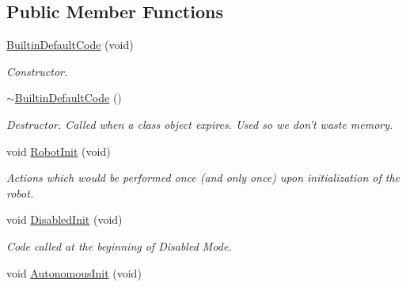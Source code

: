\subsection*{Public Member Functions}
\begin{DoxyCompactItemize}
\item 
\hyperlink{class_builtin_default_code_abcae5a572e0a119a69625edf19612203}{BuiltinDefaultCode} (void)
\begin{DoxyCompactList}\small\item\em Constructor. \item\end{DoxyCompactList}\item 
\hypertarget{class_builtin_default_code_aca7d57e622ea4ab27fb5270037cc0a22}{
\hyperlink{class_builtin_default_code_aca7d57e622ea4ab27fb5270037cc0a22}{$\sim$BuiltinDefaultCode} ()}
\label{class_builtin_default_code_aca7d57e622ea4ab27fb5270037cc0a22}

\begin{DoxyCompactList}\small\item\em Destructor. Called when a class object expires. Used so we don't waste memory. \item\end{DoxyCompactList}\item 
\hypertarget{class_builtin_default_code_adbc329f518be839e728ddc5e4d35bed1}{
void \hyperlink{class_builtin_default_code_adbc329f518be839e728ddc5e4d35bed1}{RobotInit} (void)}
\label{class_builtin_default_code_adbc329f518be839e728ddc5e4d35bed1}

\begin{DoxyCompactList}\small\item\em Actions which would be performed once (and only once) upon initialization of the robot. \item\end{DoxyCompactList}\item 
\hypertarget{class_builtin_default_code_abe31b16407ded0236a67b29fbab7e321}{
void \hyperlink{class_builtin_default_code_abe31b16407ded0236a67b29fbab7e321}{DisabledInit} (void)}
\label{class_builtin_default_code_abe31b16407ded0236a67b29fbab7e321}

\begin{DoxyCompactList}\small\item\em Code called at the beginning of Disabled Mode. \item\end{DoxyCompactList}\item 
\hypertarget{class_builtin_default_code_a054af09e7e6d8a923f703a2c124545cb}{
void \hyperlink{class_builtin_default_code_a054af09e7e6d8a923f703a2c124545cb}{AutonomousInit} (void)}
\label{class_builtin_default_code_a054af09e7e6d8a923f703a2c124545cb}


\end{DoxyCompactItemize}
